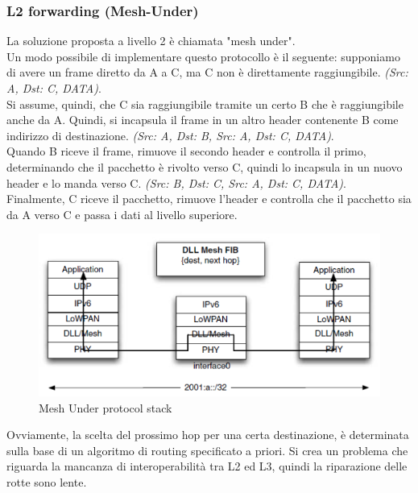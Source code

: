\documentclass{article}
\begin{document}
\subsubsection{L2 forwarding (Mesh-Under)}
La soluzione proposta a livello 2 è chiamata "mesh under".\\
Un modo possibile di implementare questo protocollo è il seguente: supponiamo di avere un frame diretto da A a C, ma C non è direttamente raggiungibile. \textit{(Src: A, Dst: C, DATA)}.\\
Si assume, quindi, che C sia raggiungibile tramite un certo B che è raggiungibile anche da A. Quindi, si incapsula il frame in un altro header contenente B come indirizzo di destinazione. \textit{(Src: A, Dst: B, Src: A, Dst: C, DATA)}.\\
Quando B riceve il frame, rimuove il secondo header e controlla il primo, determinando che il pacchetto è rivolto verso C, quindi lo incapsula in un nuovo header e lo manda verso C. \textit{(Src: B, Dst: C, Src: A, Dst: C, DATA)}.\\
Finalmente, C riceve il pacchetto, rimuove l'header e controlla che il pacchetto sia da A verso C e passa i dati al livello superiore.
\begin{figure}[H]
    \centering
    \includegraphics[scale=0.4]{figures/L2 forwarding.png}
    \caption{Mesh Under protocol stack}
\end{figure}
\noindent Ovviamente, la scelta del prossimo hop per una certa destinazione, è determinata sulla base di un algoritmo di routing specificato a priori. Si crea un problema che riguarda la mancanza di interoperabilità tra L2 ed L3, quindi la riparazione delle rotte sono lente.
\end{document}

